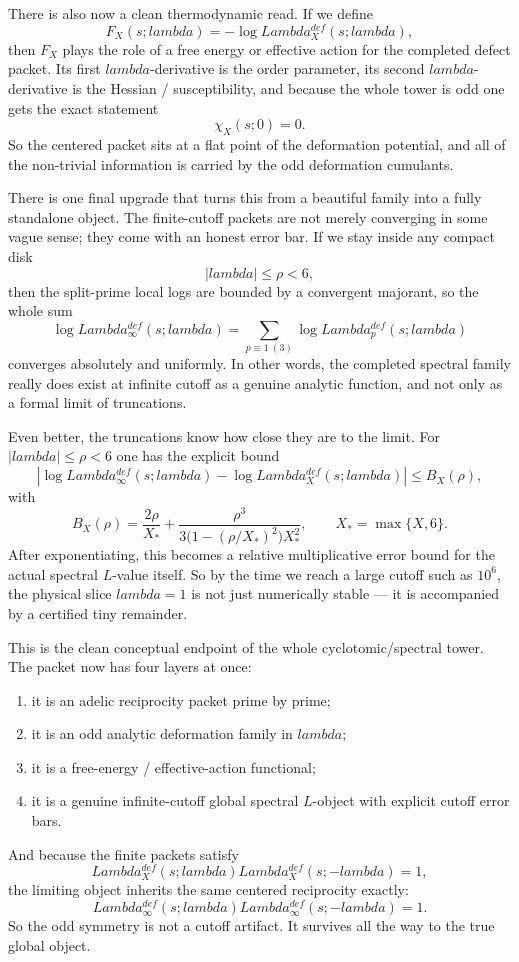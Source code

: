 \documentclass[11pt]{article}
\def\mathrm#1{#1}%
\def\mathcal#1{#1}%
\def\lambda{lambda}%
\def\Lambda{Lambda}%
\begin{document}
There is also now a clean thermodynamic read. If we define
\[
\mathcal F_X(s;\lambda)=-\log \Lambda_X^{\mathrm{def}}(s;\lambda),
\]
then $\mathcal F_X$ plays the role of a free energy or effective action for the completed defect packet. Its first $\lambda$-derivative is the order parameter, its second $\lambda$-derivative is the Hessian / susceptibility, and because the whole tower is odd one gets the exact statement
\[
\chi_X(s;0)=0.
\]
So the centered packet sits at a flat point of the deformation potential, and all of the non-trivial information is carried by the odd deformation cumulants.

There is one final upgrade that turns this from a beautiful family into a fully standalone object. The finite-cutoff packets are not merely converging in some vague sense; they come with an honest error bar. If we stay inside any compact disk
\[
|\lambda|\le \rho<6,
\]
then the split-prime local logs are bounded by a convergent majorant, so the whole sum
\[
\log \Lambda_\infty^{\mathrm{def}}(s;\lambda)=\sum_{p\equiv1\ (3)}\log \Lambda_p^{\mathrm{def}}(s;\lambda)
\]
converges absolutely and uniformly. In other words, the completed spectral family really does exist at infinite cutoff as a genuine analytic function, and not only as a formal limit of truncations.

Even better, the truncations know how close they are to the limit. For $|\lambda|\le \rho<6$ one has the explicit bound
\[
\left|\log \Lambda_\infty^{\mathrm{def}}(s;\lambda)-\log \Lambda_X^{\mathrm{def}}(s;\lambda)\right|
\le
B_X(\rho),
\]
with
\[
B_X(\rho)=\frac{2\rho}{X_*}+\frac{\rho^3}{3\bigl(1-(\rho/X_*)^2\bigr)X_*^2},
\qquad X_*=\max\{X,6\}.
\]
After exponentiating, this becomes a relative multiplicative error bound for the actual spectral $L$-value itself. So by the time we reach a large cutoff such as $10^6$, the physical slice $\lambda=1$ is not just numerically stable --- it is accompanied by a certified tiny remainder.

This is the clean conceptual endpoint of the whole cyclotomic/spectral tower. The packet now has four layers at once:
\begin{enumerate}
\item it is an adelic reciprocity packet prime by prime;
\item it is an odd analytic deformation family in $\lambda$;
\item it is a free-energy / effective-action functional;
\item it is a genuine infinite-cutoff global spectral $L$-object with explicit cutoff error bars.
\end{enumerate}
And because the finite packets satisfy
\[
\Lambda_X^{\mathrm{def}}(s;\lambda)\Lambda_X^{\mathrm{def}}(s;-\lambda)=1,
\]
the limiting object inherits the same centered reciprocity exactly:
\[
\Lambda_\infty^{\mathrm{def}}(s;\lambda)\Lambda_\infty^{\mathrm{def}}(s;-\lambda)=1.
\]
So the odd symmetry is not a cutoff artifact. It survives all the way to the true global object.
\end{document}

